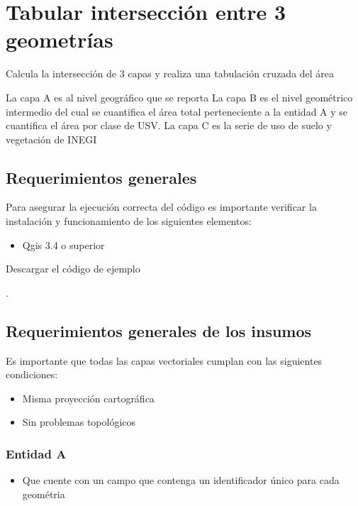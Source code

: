 \documentclass[letterpaper,10pt,spanish]{sphinxmanual}
\begin{document}
\chapter{Tabular intersección entre 3 geometrías}
\label{\detokenize{tabulacion_3geo:tabular-interseccion-entre-3-geometrias}}\label{\detokenize{tabulacion_3geo::doc}}
Calcula la intersección de 3 capas y realiza una tabulación cruzada del área

La capa A es al nivel geográfico que se reporta
La capa B es el nivel geométrico intermedio del cual se cuantifica
el área total perteneciente a la entidad A y se cuantifica el área  por clase de USV.
La capa C es la serie de uso de suelo y vegetación de INEGI


\section{Requerimientos generales}
\label{\detokenize{tabulacion_3geo:requerimientos-generales}}
Para asegurar la ejecución correcta del código es importante
verificar la instalación y funcionamiento de los siguientes elementos:
\begin{itemize}
\item {} 
Qgis 3.4 o superior

\end{itemize}

Descargar el código de ejemplo

.


\section{Requerimientos generales de los insumos}
\label{\detokenize{tabulacion_3geo:requerimientos-generales-de-los-insumos}}
Es importante que todas las capas vectoriales cumplan con las siguientes condiciones:
\begin{itemize}
\item {} 
Misma proyección cartográfica

\item {} 
Sin problemas topológicos

\end{itemize}


\subsection{Entidad A}
\label{\detokenize{tabulacion_3geo:entidad-a}}\begin{itemize}
\item {} 
Que cuente con un campo que contenga un identificador único para cada geométria

\end{itemize}
\end{document}

